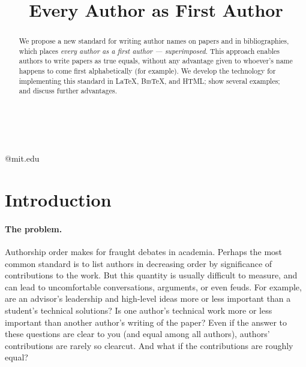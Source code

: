 \documentclass[natbib,authoryear]{sigtbd17-style}
\begin{document}
\title{Every Author as First Author}

%
%

{ \\
  \\
}
{@mit.edu}

\maketitle

\begin{abstract}
  We propose a new standard for writing author names on papers
  and in bibliographies, which places
  \emph{every author as a first author --- superimposed}.
  This approach enables authors to write papers as true equals,
  without any advantage given to whoever's name
  happens to come first alphabetically (for example).
  We develop the technology for implementing this standard
  in \LaTeX, \textsc{Bib}\TeX, and HTML;
  show several examples; and discuss further advantages.
\end{abstract}

\section{Introduction}

\paragraph{The problem.}

Authorship order makes for fraught debates in academia.
Perhaps the most common standard is to list authors in decreasing order
by significance of contributions to the work.
But this quantity is usually difficult to measure,
and can lead to uncomfortable conversations, arguments, or even feuds.
For example, are an advisor's leadership and high-level ideas
more or less important than a student's technical solutions?
Is one author's technical work more or less important than
another author's writing of the paper?
Even if the answer to these questions are clear to you
(and equal among all authors), authors' contributions are rarely so clearcut.
And what if the contributions are roughly equal?
\end{document}
